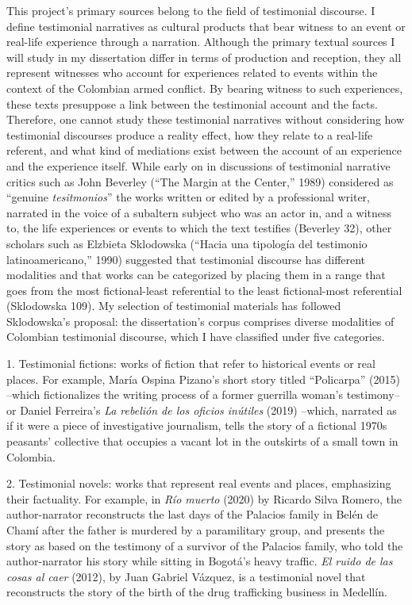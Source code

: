 \documentclass[
  11pt,
,
onecolumn,
openany
]{book}
\begin{document}
This project's primary sources belong to the field of testimonial discourse. I
define testimonial narratives as cultural products that bear witness to an
event or real-life experience through a narration. Although the primary
textual sources I will study in my dissertation differ in terms of production
and reception, they all represent witnesses who account for experiences
related to events within the context of the Colombian armed conflict. By
bearing witness to such experiences, these texts presuppose a link between the
testimonial account and the facts. Therefore, one cannot study these
testimonial narratives without considering how testimonial discourses produce
a reality effect, how they relate to a real-life referent, and what kind of
mediations exist between the account of an experience and the experience
itself. While early on in discussions of testimonial narrative critics such as
John Beverley (``The Margin at the Center,'' 1989) considered as ``genuine
\emph{tesitmonios}'' the works written or edited by a professional writer,
narrated in the voice of a subaltern subject who was an actor in, and a
witness to, the life experiences or events to which the text testifies
(Beverley 32), other scholars such as Elzbieta Sklodowska (``Hacia una
tipología del testimonio latinoamericano,'' 1990) suggested that testimonial
discourse has different modalities and that works can be categorized by
placing them in a range that goes from the most fictional-least referential to
the least fictional-most referential (Sklodowska 109). My selection of
testimonial materials has followed Sklodowska's proposal: the dissertation's
corpus comprises diverse modalities of Colombian testimonial discourse, which
I have classified under five categories.

1. Testimonial fictions: works of fiction that refer to historical events or
real places. For example, María Ospina Pizano's short story titled
``Policarpa'' (2015) --which fictionalizes the writing process of a former
guerrilla woman's testimony-- or Daniel Ferreira's \emph{La rebelión de los
oficios inútiles} (2019) --which, narrated as if it were a piece of
investigative journalism, tells the story of a fictional 1970s peasants'
collective that occupies a vacant lot in the outskirts of a small town in
Colombia.

2. Testimonial novels: works that represent real events and places,
emphasizing their factuality. For example, in \emph{Río muerto} (2020) by
Ricardo Silva Romero, the author-narrator reconstructs the last days of the
Palacios family in Belén de Chamí after the father is murdered by a
paramilitary group, and presents the story as based on the testimony of a
survivor of the Palacios family, who told the author-narrator his story while
sitting in Bogotá's heavy traffic. \emph{El ruido de las cosas al caer}
(2012), by Juan Gabriel Vázquez, is a testimonial novel that reconstructs the
story of the birth of the drug trafficking business in Medellín.
\end{document}
